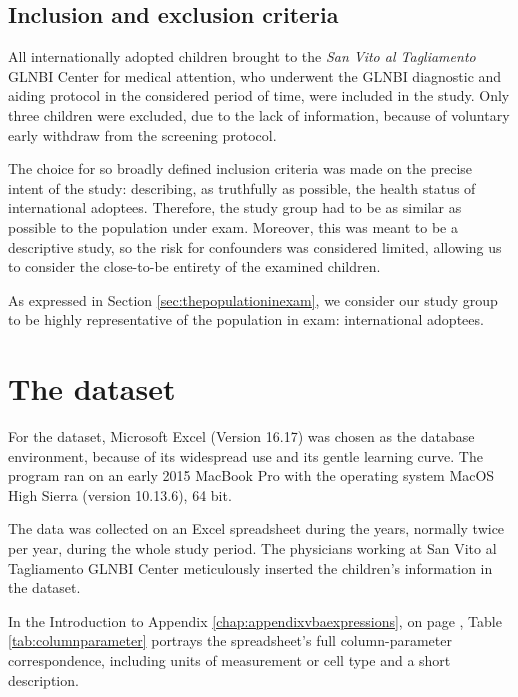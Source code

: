 \subsection{Inclusion and exclusion criteria}\label{sub:inclusionandexclusioncriteria}
All internationally adopted children brought to the \textit{San Vito al Tagliamento} GLNBI Center for medical attention, who underwent the GLNBI diagnostic and aiding protocol in the considered period of time, were included in the study. Only three children were excluded, due to the lack of information, because of voluntary early withdraw from the screening protocol.

The choice for so broadly defined inclusion criteria was made on the precise intent of the study: describing, as truthfully as possible, the health status of international adoptees. Therefore, the study group had to be as similar as possible to the population under exam. Moreover, this was meant to be a descriptive study, so the risk for confounders was considered limited, allowing us to consider the close-to-be entirety of the examined children.

As expressed in Section \ref{sec:thepopulationinexam}, we consider our study group to be highly representative of the population in exam: international adoptees.

\section{The dataset}\label{sec:dataset}
For the dataset, Microsoft Excel (Version 16.17) was chosen as the database environment, because of its widespread use and its gentle learning curve. The program ran on an early 2015 MacBook Pro with the operating system MacOS High Sierra (version 10.13.6), 64 bit.

The data was collected on an Excel spreadsheet during the years, normally twice per year, during the whole study period. The physicians working at San Vito al Tagliamento GLNBI Center meticulously inserted the children's information in the dataset.

In the Introduction to Appendix \ref{chap:appendixvbaexpressions}, on page \pageref{chap:appendixvbaexpressions}, Table \ref{tab:columnparameter} portrays the spreadsheet's full column-parameter correspondence, including units of measurement or cell type and a short description.

